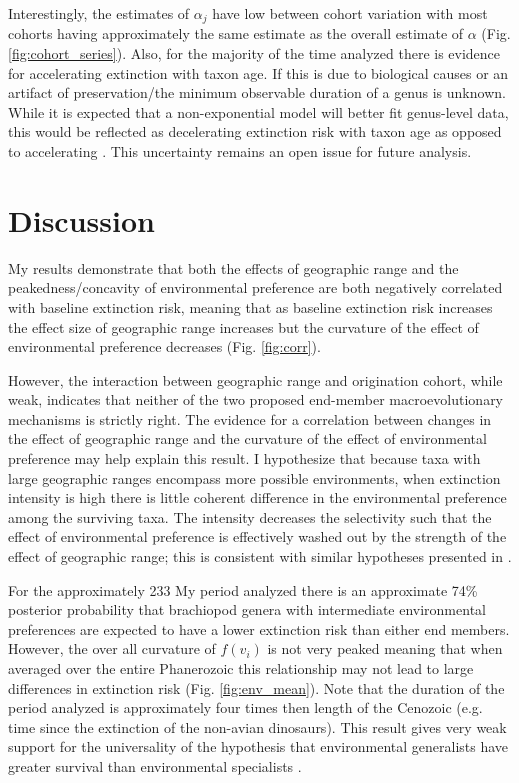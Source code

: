 \documentclass{article}
\begin{document}
Interestingly, the estimates of \(\alpha_{j}\) have low between cohort variation with most cohorts having approximately the same estimate as the overall estimate of \(\alpha\) (Fig. \ref{fig:cohort_series}). Also, for the majority of the time analyzed there is evidence for accelerating extinction with taxon age. If this is due to biological causes \citep{Wagner2014b,Rosindell2015a} or an artifact of preservation/the minimum observable duration of a genus \citep{Sepkoski1975} is unknown. While it is expected that a non-exponential model will better fit genus-level data, this would be reflected as decelerating extinction risk with taxon age as opposed to accelerating \citep{Raup1975,Raup1978,Raup1985,Foote2001a}. This uncertainty remains an open issue for future analysis.

\section{Discussion}

My results demonstrate that both the effects of geographic range and the peakedness/concavity of environmental preference are both negatively correlated with baseline extinction risk, meaning that as baseline extinction risk increases the effect size of geographic range increases but the curvature of the effect of environmental preference decreases (Fig. \ref{fig:corr}). 

However, the interaction between geographic range and origination cohort, while weak, indicates that neither of the two proposed end-member macroevolutionary mechanisms is strictly right. The evidence for a correlation between changes in the effect of geographic range and the curvature of the effect of environmental preference may help explain this result. I hypothesize that because taxa with large geographic ranges encompass more possible environments, when extinction intensity is high there is little coherent difference in the environmental preference among the surviving taxa. The intensity decreases the selectivity such that the effect of environmental preference is effectively washed out by the strength of the effect of geographic range; this is consistent with similar hypotheses presented in \citet{Raup1991b}. 

For the approximately 233 My period analyzed there is an approximate 74\% posterior probability that brachiopod genera with intermediate environmental preferences are expected to have a lower extinction risk than either end members. However, the over all curvature of \(f(v_{i})\) is not very peaked meaning that when averaged over the entire Phanerozoic this relationship may not lead to large differences in extinction risk (Fig. \ref{fig:env_mean}). Note that the duration of the period analyzed is approximately four times then length of the Cenozoic (e.g. time since the extinction of the non-avian dinosaurs). This result gives very weak support for the universality of the hypothesis that environmental generalists have greater survival than environmental specialists \citep{Simpson1944,Liow2004a,Liow2007b,Nurnberg2013a,Nurnberg2015}.
\end{document}
